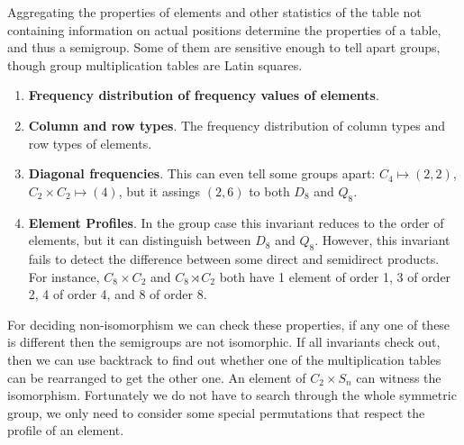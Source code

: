 \documentclass{amsart}
\theoremstyle{plain}
\theoremstyle{definition}
\begin{document}
Aggregating the properties of elements and other statistics of the table not containing information on actual positions determine the properties of a table, and thus a semigroup. Some of them are sensitive enough to tell apart groups, though group multiplication tables are Latin squares.
\begin{enumerate}
\item\textbf{Frequency distribution of frequency values of elements}. %
\item\textbf{Column and row types}. The frequency distribution of column types and row types of elements. %
\item \textbf{Diagonal frequencies}. This can even tell some groups apart: $C_4\mapsto (2,2)$, $C_2\times C_2\mapsto (4)$, but it assings $(2,6)$ to both $D_8$ and $Q_8$.
\item \textbf{Element Profiles}. In the group case this invariant reduces to the order of elements, but it can distinguish between $D_8$ and $Q_8$. However, this invariant fails to detect the difference between some direct and semidirect products. For instance, $C_8\times C_2$ and $C_8\rtimes C_2$ both have 1 element of order 1, 3 of order 2, 4 of order 4, and 8 of order 8.
\end{enumerate} 

For deciding non-isomorphism we can check these properties, if any one of these is different then the semigroups are not isomorphic.
If all invariants check out, then we can use backtrack to find out whether one of the multiplication tables can be rearranged to get the other one.
An element of $C_2\times S_n$ can witness the isomorphism.
Fortunately we do not have to search through the whole symmetric group, we only need to consider some special permutations that respect the profile of an element.
\end{document}
